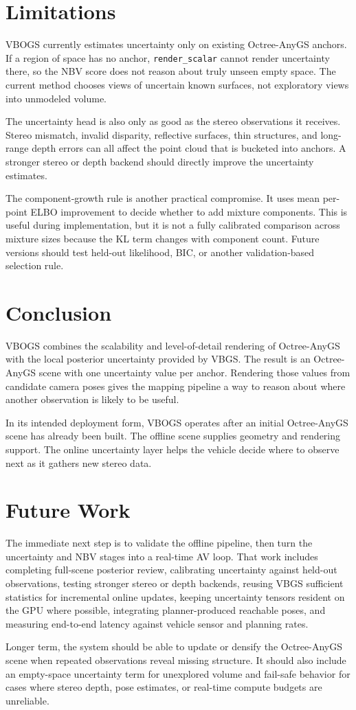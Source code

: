 \documentclass{article}
\begin{document}
\section{Limitations}
VBOGS currently estimates uncertainty only on existing Octree-AnyGS anchors. If a region of space has no anchor, \texttt{render\_scalar} cannot render uncertainty there, so the NBV score does not reason about truly unseen empty space. The current method chooses views of uncertain known surfaces, not exploratory views into unmodeled volume.

The uncertainty head is also only as good as the stereo observations it receives. Stereo mismatch, invalid disparity, reflective surfaces, thin structures, and long-range depth errors can all affect the point cloud that is bucketed into anchors. A stronger stereo or depth backend should directly improve the uncertainty estimates.

The component-growth rule is another practical compromise. It uses mean per-point ELBO improvement to decide whether to add mixture components. This is useful during implementation, but it is not a fully calibrated comparison across mixture sizes because the KL term changes with component count. Future versions should test held-out likelihood, BIC, or another validation-based selection rule.

\section{Conclusion}
VBOGS combines the scalability and level-of-detail rendering of Octree-AnyGS with the local posterior uncertainty provided by VBGS. The result is an Octree-AnyGS scene with one uncertainty value per anchor. Rendering those values from candidate camera poses gives the mapping pipeline a way to reason about where another observation is likely to be useful.

In its intended deployment form, VBOGS operates after an initial Octree-AnyGS scene has already been built. The offline scene supplies geometry and rendering support. The online uncertainty layer helps the vehicle decide where to observe next as it gathers new stereo data.

\section{Future Work}
The immediate next step is to validate the offline pipeline, then turn the uncertainty and NBV stages into a real-time AV loop. That work includes completing full-scene posterior review, calibrating uncertainty against held-out observations, testing stronger stereo or depth backends, reusing VBGS sufficient statistics for incremental online updates, keeping uncertainty tensors resident on the GPU where possible, integrating planner-produced reachable poses, and measuring end-to-end latency against vehicle sensor and planning rates.

Longer term, the system should be able to update or densify the Octree-AnyGS scene when repeated observations reveal missing structure. It should also include an empty-space uncertainty term for unexplored volume and fail-safe behavior for cases where stereo depth, pose estimates, or real-time compute budgets are unreliable.
\end{document}
